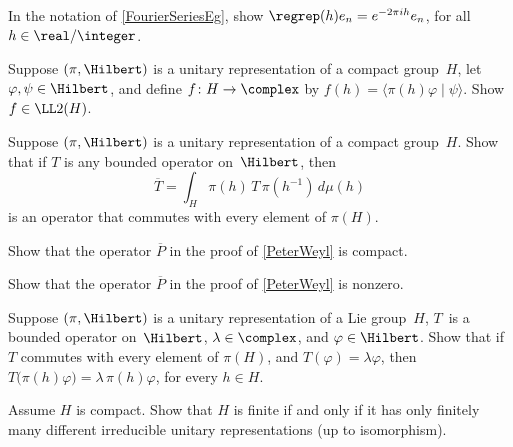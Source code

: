 \begin{exercises}

\item \label{TorusEigenvector} 
In the notation of \cref{FourierSeriesEg}, show $\regrep(h) e_n = e^{-2\pi i h} e_n$, for all $h \in \real/\integer$.

\item \label{MatCoeffOfCpct}
Suppose $(\pi,\Hilbert)$ is a unitary representation of a compact group~$H$, let $\varphi,\psi \in \Hilbert$, and define $f \colon H \to \complex$ by $f(h) = \langle \pi(h) \varphi \mid \psi \rangle$. Show $f \in \LL2(H)$.

\item \label{AvgOpCommutes}
Suppose $(\pi,\Hilbert)$ is a unitary representation of a compact group~$H$. Show that if $T$ is any bounded operator on~$\Hilbert$, then 
	$$\overline{T} = \int_H \pi(h) \, T \, \pi(h^{-1}) \, d\mu(h)$$
is an operator that commutes with every element of $\pi(H)$.

\item \label{PbarCpct}
Show that the operator $\overline{P}$ in the proof of \cref{PeterWeyl} is compact.

\item \label{PbarNonzero}
Show that the operator $\overline{P}$ in the proof of \cref{PeterWeyl} is nonzero.

\item \label{Commutes->EigInvt}
Suppose $(\pi,\Hilbert)$ is a unitary representation of a Lie group~$H$, $T$~is a bounded operator on~$\Hilbert$, $\lambda \in \complex$, and $\varphi \in \Hilbert$. Show that if $T$ commutes with every element of $\pi(H)$, and $T(\varphi) = \lambda \varphi$, then $T \bigl( \pi(h) \varphi \bigr) = \lambda \, \pi(h) \varphi$, for every $h \in H$.

\item Assume $H$ is compact. Show that $H$ is finite if and only if it has only finitely many different irreducible unitary representations (up to isomorphism).


\end{exercises}
